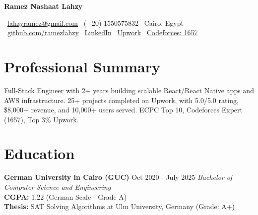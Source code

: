 \documentclass[8pt,a4paper]{article}
\newcommand{\cvheader}[1]{%
    \begin{center}
        {\Large\bfseries\color{primarycolor} #1}
    \end{center}
}
\newcommand{\contactinfo}[1]{%
    \begin{center}
        \small #1
    \end{center}
    \vspace{0.02em}
}
\newcommand{\cventry}[4]{%
    \textbf{#1} \hfill {\small\color{secondarycolor} #2} \hfill {\footnotesize\textit{#3}}\\
    #4
    \vspace{0.02em}
}
\begin{document}

\cvheader{Ramez Nashaat Lahzy}

\contactinfo{
\faEnvelope\ \href{mailto:lahzyramez@gmail.com}{lahzyramez@gmail.com} \quad
\faPhone\ (+20) 1550575832 \quad
\faMapMarker\ Cairo, Egypt \\
\faGithub\ \href{https://github.com/ramezlahzy}{github.com/ramezlahzy} \quad
\faLinkedin\ \href{https://linkedin.com/in/ramez-lahzy-37188021a/}{LinkedIn} \quad
\faGlobe\ \href{https://www.upwork.com/freelancers/ramezn3}{Upwork} \quad
\faCode\ \href{https://codeforces.com/profile/Ramez__}{Codeforces: 1657}
}


\section{Professional Summary}

 Full-Stack Engineer with 2+ years building scalable React/React Native apps and AWS infrastructure. 25+ projects completed on Upwork, with 5.0/5.0 rating, \$8,000+ revenue, and 10,000+ users served. ECPC Top 10, Codeforces Expert (1657), Top 3\% Upwork.



\section{Education}

\cventry{German University in Cairo (GUC)}{Oct 2020 - July 2025}{Bachelor of Computer Science and Engineering}{
\textbf{CGPA:} 1.22 (German Scale - Grade A) \\
\textbf{Thesis:} SAT Solving Algorithms at Ulm University, Germany (Grade: A+)
}

\end{document}
